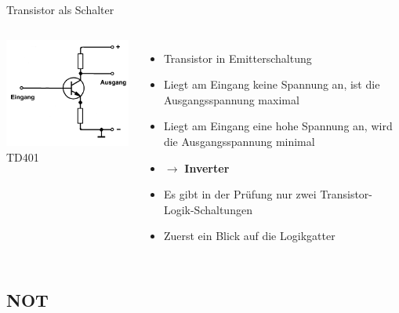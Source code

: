 \begin{frame}{Transistor als Schalter}
  \begin{columns}
      \includegraphics[width=\textwidth,height=.8\textheight,keepaspectratio]{a14/td401_simplified.png}\\
      {\tiny TD401 \hyperlink{refs}{\cite{bna}}}\\
      \pause
      \begin{itemize}
        \item Transistor in Emitterschaltung
        \item Liegt am Eingang keine Spannung an, ist die Ausgangsspannung maximal
        \item Liegt am Eingang eine hohe Spannung an, wird die Ausgangsspannung minimal
        \item $\rightarrow$ \textbf{Inverter}
          \pause
        \item Es gibt in der Prüfung nur zwei Transistor-Logik-Schaltungen
        \item Zuerst ein Blick auf die Logikgatter
      \end{itemize}
  \end{columns}
\end{frame}

\subsection{NOT}

